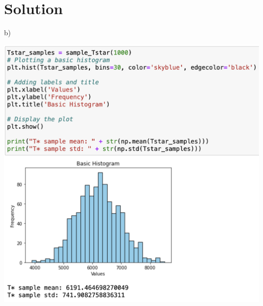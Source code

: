 \documentclass{harvardml}
\theoremstyle{definition}
\theoremstyle{plain}
\newenvironment{solution}
  {\color{blue}\section*{Solution}}
{}
\begin{document}
\begin{solution}
\begin{enumerate}
    b) \begin{center}
        \includegraphics[scale=0.55]{3.5b.png}
    \end{center}
\end{enumerate}
\end{solution} 
\end{document}
